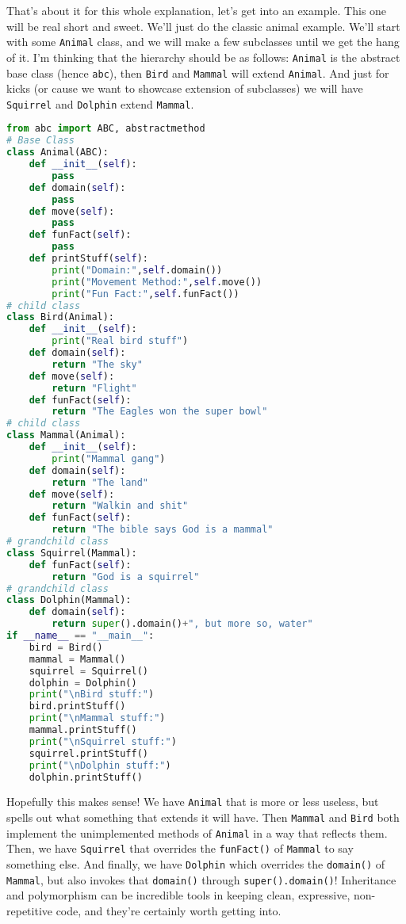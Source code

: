 \documentclass[11pt, twoside, reqno]{book}
\begin{document}
That's about it for this whole explanation, let's get into an example. This one will be real short and sweet. We'll just do the classic animal example. We'll start with some \texttt{Animal} class, and we will make a few subclasses until we get the hang of it. I'm thinking that the hierarchy should be as follows: \texttt{Animal} is the abstract base class (hence \texttt{abc}), then \texttt{Bird} and \texttt{Mammal} will extend \texttt{Animal}. And just for kicks (or cause we want to showcase extension of subclasses) we will have \texttt{Squirrel} and \texttt{Dolphin} extend \texttt{Mammal}.
\begin{lstlisting}[language=Python]
from abc import ABC, abstractmethod 
# Base Class
class Animal(ABC):
    def __init__(self):
        pass
    def domain(self):
        pass
    def move(self):
        pass
    def funFact(self):
        pass
    def printStuff(self):
        print("Domain:",self.domain())
        print("Movement Method:",self.move())
        print("Fun Fact:",self.funFact())
# child class
class Bird(Animal):
    def __init__(self):
        print("Real bird stuff")
    def domain(self):
        return "The sky"
    def move(self):
        return "Flight"
    def funFact(self):
        return "The Eagles won the super bowl"
# child class
class Mammal(Animal):
    def __init__(self):
        print("Mammal gang")
    def domain(self):
        return "The land"
    def move(self):
        return "Walkin and shit"
    def funFact(self):
        return "The bible says God is a mammal"
# grandchild class
class Squirrel(Mammal):
    def funFact(self):
        return "God is a squirrel"
# grandchild class
class Dolphin(Mammal):
    def domain(self):
        return super().domain()+", but more so, water"
if __name__ == "__main__":
    bird = Bird()
    mammal = Mammal()
    squirrel = Squirrel()
    dolphin = Dolphin()
    print("\nBird stuff:")
    bird.printStuff()
    print("\nMammal stuff:")
    mammal.printStuff()
    print("\nSquirrel stuff:")
    squirrel.printStuff()
    print("\nDolphin stuff:")
    dolphin.printStuff()
\end{lstlisting}

Hopefully this makes sense! We have \texttt{Animal} that is more or less useless, but spells out what something that extends it will have. Then \texttt{Mammal} and \texttt{Bird} both implement the unimplemented methods of \texttt{Animal} in a way that reflects them. Then, we have \texttt{Squirrel} that overrides the \texttt{funFact()} of \texttt{Mammal} to say something else. And finally, we have \texttt{Dolphin} which overrides the \texttt{domain()} of \texttt{Mammal}, but also invokes that \texttt{domain()} through \texttt{super().domain()}! Inheritance and polymorphism can be incredible tools in keeping clean, expressive, non-repetitive code, and they're certainly worth getting into.
\end{document}
